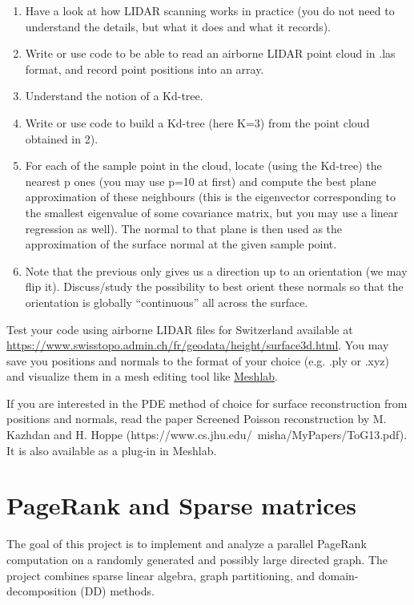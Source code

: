 \documentclass[11pt]{article}
\begin{document}
\begin{enumerate}
\item Have a look at how LIDAR scanning works in practice (you do not need to understand
the details, but what it does and what it records).
\item Write or use code to be able to read an airborne LIDAR point cloud in .las format, and
record point positions into an array.
\item Understand the notion of a Kd-tree.
\item Write or use code to build a Kd-tree (here K=3) from the point cloud obtained in 2).
\item For each of the sample point in the cloud, locate (using the Kd-tree) the
	nearest p ones
(you may use p=10 at first) and compute the best plane approximation of these neighbours
(this is the eigenvector corresponding to the smallest eigenvalue of some covariance matrix,
but you may use a linear regression as well). The normal to that plane is then used as the
approximation of the surface normal at the given sample point.
\item Note that the previous only gives us a direction up to an orientation (we may flip it).
Discuss/study the possibility to best orient these normals so that the orientation is globally
“continuous” all across the surface.
\end{enumerate}
Test your code using airborne LIDAR files for Switzerland available at
\url{https://www.swisstopo.admin.ch/fr/geodata/height/surface3d.html}. 
You may save you positions and normals to the format of your choice 
(e.g. .ply or .xyz) and visualize them in a mesh editing tool like
\href{https://www.meshlab.net}{Meshlab}.

If you are interested in the PDE method of choice for surface reconstruction from 
positions and normals, read the paper Screened Poisson reconstruction by M. Kazhdan and H.
Hoppe (https://www.cs.jhu.edu/~misha/MyPapers/ToG13.pdf). It is also available as a plug-in
in Meshlab.	

\section{PageRank and Sparse matrices}

The goal of this project is to implement and analyze a parallel PageRank
computation on a randomly generated and possibly large directed graph. The
project combines sparse linear algebra, graph partitioning, and
domain-decomposition (DD) methods.
\end{document}
